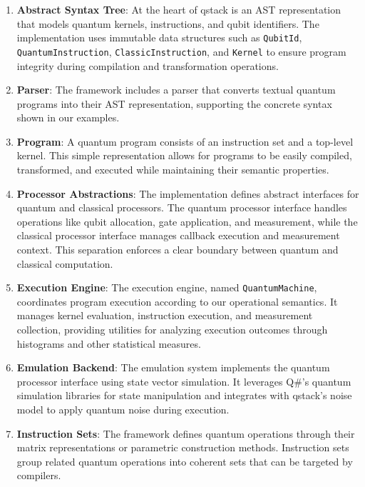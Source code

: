 \begin{enumerate}
\item \textbf{Abstract Syntax Tree}: At the heart of qstack is an AST representation that models quantum kernels, instructions, and qubit identifiers. The implementation uses immutable data structures such as \texttt{QubitId}, \texttt{QuantumInstruction}, \texttt{ClassicInstruction}, and \texttt{Kernel} to ensure program integrity during compilation and transformation operations.

\item \textbf{Parser}: The framework includes a parser that converts textual quantum programs into their AST representation, supporting the concrete syntax shown in our examples.

\item \textbf{Program}: A quantum program consists of an instruction set and a top-level kernel. This simple representation allows for programs to be easily compiled, transformed, and executed while maintaining their semantic properties.

\item \textbf{Processor Abstractions}: The implementation defines abstract interfaces for quantum and classical processors. The quantum processor interface handles operations like qubit allocation, gate application, and measurement, while the classical processor interface manages callback execution and measurement context. This separation enforces a clear boundary between quantum and classical computation.

\item \textbf{Execution Engine}: The execution engine, named \texttt{QuantumMachine}, coordinates program execution according to our operational semantics. It manages kernel evaluation, instruction execution, and measurement collection, providing utilities for analyzing execution outcomes through histograms and other statistical measures.

\item \textbf{Emulation Backend}: The emulation system implements the quantum processor interface using state vector simulation. It leverages Q\#'s quantum simulation libraries for state manipulation and integrates with qstack's noise model to apply quantum noise during execution.

\item \textbf{Instruction Sets}: The framework defines quantum operations through their matrix representations or parametric construction methods. Instruction sets group related quantum operations into coherent sets that can be targeted by compilers.


\end{enumerate}
